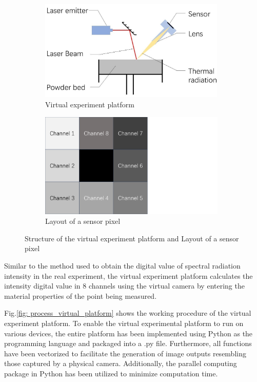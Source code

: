 \begin{figure}[htbp]
    \centering
    \begin{subfigure}{0.6\textwidth}
        \centering
        \includegraphics[height=4.8cm]{figures/virtual_platform.jpg}
        \caption{Virtual experiment platform}
        \label{fig: virtual_platform}
    \end{subfigure}
    \hfill
    \begin{subfigure}{0.37\textwidth}
        \centering
        \includegraphics[height=5cm]{figures/sensor_pixel.pdf}
        \caption{Layout of a sensor pixel}
        \label{fig: sensor_pixel}
    \end{subfigure}
    \caption{Structure of the virtual experiment platform and Layout of a sensor pixel}
    \label{fig: virtual_pixel}
\end{figure}


Similar to the method used to obtain the digital value of spectral radiation intensity 
in the real experiment, the virtual experiment platform calculates the 
intensity digital value in 8 channels using the virtual camera by entering 
the material properties of the point being measured.


Fig.\ref{fig: process_virtual_platform} shows the working procedure of the 
virtual experiment platform. 
To enable the virtual experimental platform to run on various devices, 
the entire platform has been implemented using Python as the 
programming language and packaged into a .py file. Furthermore, all 
functions have been vectorized to facilitate the generation of image 
outputs resembling those captured by a physical camera. Additionally, 
the parallel computing package in Python has been utilized to minimize 
computation time.


